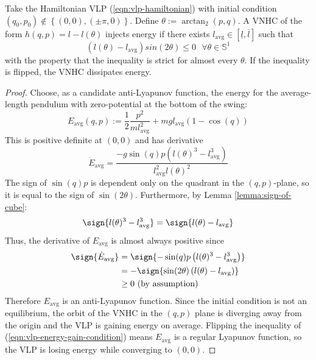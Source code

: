 \begin{thm}\label{thm:vlp-energy-stabilization}
   Take the Hamiltonian VLP (\ref{eqn:vlp-hamiltonian}) with initial condition 
   \((q_0,p_0) \not \in \left\{(0,0),(\pm\pi,0)\right\}\).
   Define \(\theta := \arctan_2(p,q)\). 
   A VNHC of the form \(h(q,p) = l - l(\theta)\) injects energy if there exists 
   \(l_\text{avg} \in [\underline{l},\overline{l}]\) such that 
   \begin{equation}\label{eqn:vlp-energy-gain-condition}
      \left(l(\theta) - l_\text{avg}\right)sin(2\theta) \leq 0 \text{ }\forall \theta \in \mathbb{S}^1
   \end{equation}
   with the property that the inequality is strict for almost every \(\theta\).
   If the inequality is flipped, the VNHC dissipates energy. 
\end{thm}
\begin{proof}
    Choose, as a candidate anti-Lyapunov function, the energy for the
    average-length pendulum with zero-potential at the bottom of the swing:
    \[
       E_\text{avg}(q,p) := \frac{1}{2}\frac{p^2}{m l_\text{avg}^2} 
                    + m g l_\text{avg} (1-\cos(q))
    \]
    This is positive definite at \((0,0)\) and has derivative 
    \[
      \dot{E}_\text{avg} = \frac{-g\sin(q)p \left(l(\theta)^3 - l_\text{avg}^3\right)}
                 {l_\text{avg}^2l(\theta)^2}
    \]
    The sign of \(\sin(q)p\) is dependent only on the quadrant in the
    \((q,p)\)-plane, so it is equal to the sign of \(\sin(2\theta)\). 
    Furthermore, by Lemma \ref{lemma:sign-of-cube}:
    \[ 
       \sign{l(\theta)^3 - l_\text{avg}^3} = \sign{ l(\theta) - l_\text{avg}}
    \]
    Thus, the derivative of \(E_\text{avg}\) is almost always positive since
    \begin{align*}
       \label{eq:}
       \sign{\dot{E}_\text{avg}} &= \sign{-\sin(q)p \left(l(\theta)^3 - l_\text{avg}^3\right)} \\
                   &= -\sign{\sin(2\theta) \left(l(\theta) - l_\text{avg}\right)} \\
                   &\geq 0 \text{ (by assumption)}
    \end{align*}
    Therefore \(E_\text{avg}\) is an anti-Lyapunov function.
    Since the initial condition is not an equilibrium,
    the orbit of the VNHC in the \((q,p)\) plane is diverging away from the
    origin and the VLP is gaining energy on average.
    Flipping the inequality of (\ref{eqn:vlp-energy-gain-condition}) 
    means \(E_\text{avg}\) is a regular Lyapunov function, so the VLP is
    losing energy while converging to \((0,0)\).
 \end{proof}

